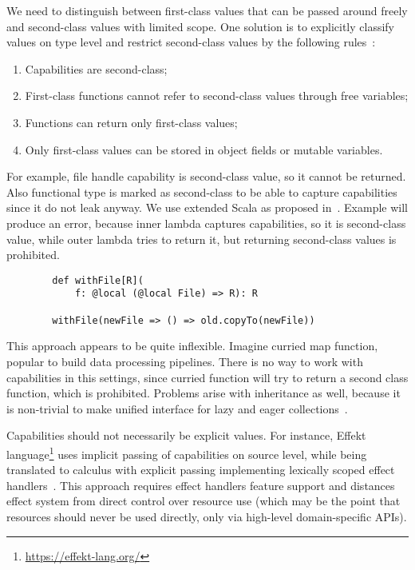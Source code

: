 \documentclass[conference]{IEEEtran}
\begin{document}
    We need to distinguish between first-class values that can be passed around freely and second-class values with limited scope.
    One solution is to explicitly classify values on type level and restrict second-class values by the following rules~\cite{osvald2016gentrification}:
    \begin{enumerate}
        \item Capabilities are second-class;
        \item First-class functions cannot refer to second-class values through free variables;
        \item Functions can return only first-class values;
        \item Only first-class values can be stored in object fields or mutable variables.
    \end{enumerate}

    For example, file handle capability is second-class value, so it cannot be returned.
    Also functional type is marked as second-class to be able to capture capabilities since it do not leak anyway.
    We use extended Scala as proposed in~\cite{osvald2016gentrification}.
    Example will produce an error, because inner lambda captures capabilities, so it is second-class value, while outer lambda tries to return it, but returning second-class values is prohibited.
    \begin{verbatim}
        def withFile[R](
            f: @local (@local File) => R): R

        withFile(newFile => () => old.copyTo(newFile))
    \end{verbatim}

    This approach appears to be quite inflexible.
    Imagine curried map function, popular to build data processing pipelines.
    There is no way to work with capabilities in this settings, since curried function will try to return a second class function, which is prohibited.
    Problems arise with inheritance as well, because it is non-trivial to make unified interface for lazy and eager collections~\cite{osvald2016gentrification}.

    Capabilities should not necessarily be explicit values.
    For instance, Effekt language\footnote{\url{https://effekt-lang.org/}} uses implicit passing of capabilities on source level, while being translated to calculus with explicit passing implementing lexically scoped effect handlers~\cite{brachthauser2020effects}.
    This approach requires effect handlers feature support and distances effect system from direct control over resource use (which may be the point that resources should never be used directly, only via high-level domain-specific APIs).
\end{document}
